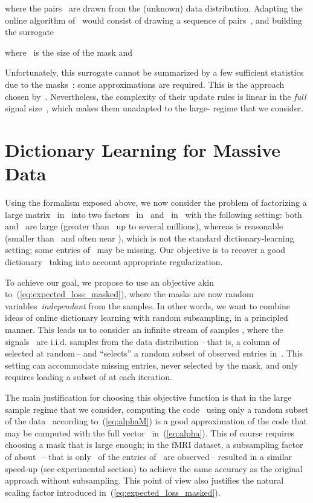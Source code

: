 \documentclass{article}
\begin{document}
where the pairs~ are drawn from the (unknown) data distribution.
Adapting the online algorithm of~\citet{mairal_online_2010} would consist of
drawing a sequence of pairs~, and building the surrogate

where~ is the size of the mask and

Unfortunately, this surrogate cannot be summarized by a few sufficient
statistics due to the masks~: some approximations are required.
This is the approach chosen by~\citet{szabo_online_2011}. Nevertheless, the
complexity of their update rules is linear in the \textit{full} signal size~, which makes
them unadapted to the large- regime that we consider.






\section{Dictionary Learning for Massive Data}

Using the formalism exposed above, we now consider the problem of factorizing a
large matrix~ in~ into two factors~ in~ and~ in~ with the following setting:
both  and~ are large (greater than~ up to several millions),
whereas  is reasonable (smaller than~ and often near ),
which is not the standard dictionary-learning setting; some
entries of~ may be missing.  Our objective is to recover a good
dictionary~ taking into account appropriate regularization.

To achieve our goal, we propose to use an objective akin
to~(\ref{eq:expected_loss_masked}), where the masks are now random variables~\textit{independant} from the samples.
In other words, we want to combine ideas of online dictionary learning with
random subsampling, in a principled manner. This leads us to consider an
infinite stream of samples , where the signals~ are i.i.d.
samples from the data distribution --\,that is, a column of~ selected at
random\,-- and  ``selects'' a random subset of observed entries in~.
This setting can accommodate missing entries, never selected by the
mask, and only requires loading a subset of  at each iteration.

The main justification for choosing this objective function is that
in the large sample regime  that we consider,
computing the code~ using only a random subset of the data~
according to~(\ref{eq:alphaM}) is a good approximation of the code that may be
computed with the full vector~ in~(\ref{eq:alpha}). This of course
requires choosing a mask that is large enough; in the fMRI dataset, a
subsampling factor of about~ --\,that is only~ of the entries
of~ are observed\,-- resulted in a similar  speed-up (see
experimental section) to achieve the same accuracy as the original approach without subsampling.  This point of view also justifies the
natural scaling factor 
introduced in~(\ref{eq:expected_loss_masked}).
\end{document}
